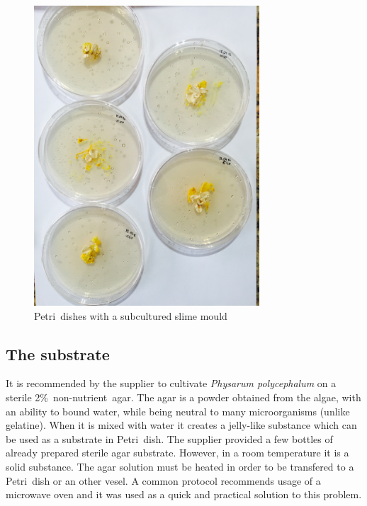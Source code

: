 \begin{figure}
  \centering

  \includegraphics[width=0.75\textwidth]{figures/physarum/IMG_1175.jpg}

  \caption{Petri~dishes with a subcultured slime mould}
  \label{figure:p_multiple_petri}
\end{figure}


\subsection*{The substrate}

It is recommended by the supplier to cultivate \textit{Physarum polycephalum} on a sterile 2\%~non-nutrient~agar. The agar is a powder obtained from the algae, with an ability to bound water, while being neutral to many microorganisms (unlike gelatine). When it is mixed with water it creates a jelly-like substance which can be used as a substrate in Petri~dish. The supplier provided a few bottles of already prepared sterile agar substrate. However, in a room temperature it is a solid substance. The agar solution must be heated in order to be transfered to a Petri~dish or an other vesel. A common protocol recommends usage of a microwave oven \cite{hanson1978microwave} and it was used as a quick and practical solution to this problem. 

